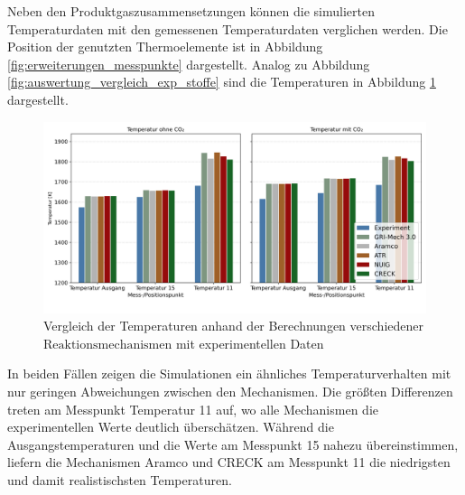         Neben den Produktgaszusammensetzungen können die simulierten Temperaturdaten mit den gemessenen Temperaturdaten verglichen werden. Die Position der genutzten Thermoelemente ist in Abbildung \ref{fig:erweiterungen_messpunkte} dargestellt. Analog zu Abbildung \ref{fig:auswertung_vergleich_exp_stoffe} sind die Temperaturen in Abbildung \ref{fig:auswertung_vergleich_exp_temp} dargestellt. 
        \begin{figure}[H]
            \centering
            \includegraphics[width=1\linewidth]{img/Vergleich_mech/Vergleich_Temperaturen_gap_manual.png}
            \caption{Vergleich der Temperaturen anhand der Berechnungen verschiedener $\mbox{Reaktionsmechanismen}$ mit experimentellen Daten}
            \label{fig:auswertung_vergleich_exp_temp}
        \end{figure}

        In beiden Fällen zeigen die Simulationen ein ähnliches Temperaturverhalten mit nur geringen Abweichungen zwischen den Mechanismen. Die größten Differenzen treten am Messpunkt Temperatur 11 auf, wo alle Mechanismen die experimentellen Werte deutlich überschätzen. Während die Ausgangstemperaturen und die Werte am Messpunkt 15 nahezu übereinstimmen, liefern die Mechanismen Aramco und CRECK am Messpunkt 11 die niedrigsten und damit realistischsten Temperaturen.


